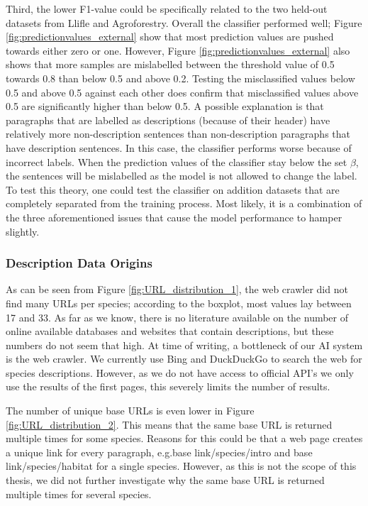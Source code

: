 \documentclass[a4paper, 12pt, oneside]{book} %
\begin{document}
Third, the lower F1-value could be specifically related to the two held-out datasets from Llifle and Agroforestry.
Overall the classifier performed well; Figure \ref{fig:predictionvalues_external} show that most prediction values are pushed towards either zero or one.
However, Figure \ref{fig:predictionvalues_external} also shows that more samples are mislabelled between the threshold value of 0.5 towards 0.8 than below 0.5 and above 0.2.
Testing the misclassified values below 0.5 and above 0.5 against each other does confirm that misclassified values above 0.5 are significantly higher than below 0.5.
A possible explanation is that paragraphs that are labelled as descriptions (because of their header) have relatively more non-description sentences than non-description paragraphs that have description sentences.
In this case, the classifier performs worse because of incorrect labels.
When the prediction values of the classifier stay below the set \(\beta\), the sentences will be mislabelled as the model is not allowed to change the label.
To test this theory, one could test the classifier on addition datasets that are completely separated from the training process.
Most likely, it is a combination of the three aforementioned issues that cause the model performance to hamper slightly.


\subsubsection{Description Data Origins}
As can be seen from Figure \ref{fig:URL_distribution_1}, the web crawler did not find many URLs per species; according to the boxplot, most values lay between 17 and 33.
As far as we know, there is no literature available on the number of online available databases and websites that contain descriptions, but these numbers do not seem that high.
At time of writing, a bottleneck of our AI system is the web crawler.
We currently use Bing and DuckDuckGo to search the web for species descriptions.
However, as we do not have access to official API's we only use the results of the first pages, this severely limits the number of results.


The number of unique base URLs is even lower in Figure \ref{fig:URL_distribution_2}.
This means that the same base URL is returned multiple times for some species. 
Reasons for this could be that a web page creates a unique link for every paragraph, e.g.base link/species/intro and base link/species/habitat for a single species.
However, as this is not the scope of this thesis, we did not further investigate why the same base URL is returned multiple times for several species.
\end{document}
